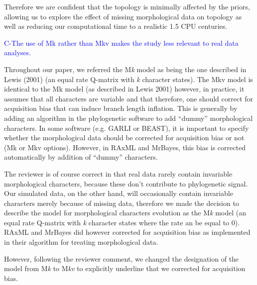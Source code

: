 \documentclass[11pt]{letter}
\begin{document}
\begin{letter}{}

Therefore we are confident that the topology is minimally affected by the priors, allowing us to explore the effect of missing morphological data on topology as well as reducing our computational time to a realistic 1.5 CPU centuries.




\textcolor{blue}{C-The use of Mk rather than Mkv makes the study less relevant to real data analyses.}

Throughout our paper, we referred the M\textit{k} model as being the one described in Lewis (2001) (an equal rate Q-matrix with \textit{k} character states). The Mkv model is identical to the Mk model (as described in Lewis 2001) however, in practice, it assumes that all characters are variable and that therefore, one should correct for acquisition bias that can induce branch length inflation. This is generally by adding an algorithm in the phylogenetic software to add ``dummy'' morphological characters. In some software (e.g. GARLI or BEAST), it is important to specify whether the morphological data should be corrected for acquisition bias or not (Mk or Mkv options). However, in RAxML and MrBayes, this bias is corrected automatically by addition of ``dummy'' characters. 

The reviewer is of course correct in that real data rarely contain invariable morphological characters, because these don't contribute to phylogenetic signal. Our simulated data, on the other hand, will occasionally contain invariable characters merely because of missing data, therefore we made the decision to describe the model for morphological characters evolution as the M\textit{k} model (an equal rate Q-matrix with \textit{k} character states where the rate an be equal to 0). RAxML and MrBayes did however corrected for acquisition bias as implemented in their algorithm for treating morphological data.

However, following the reviewer comment, we changed the designation of the model from M\textit{k} to M\textit{kv} to explicitly underline that we corrected for acquisition bias.



\end{letter}
\end{document}
